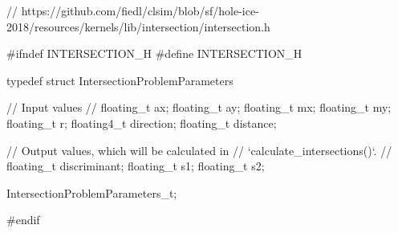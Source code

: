 \begin{ccode}
// https://github.com/fiedl/clsim/blob/sf/hole-ice-2018/resources/kernels/lib/intersection/intersection.h

#ifndef INTERSECTION_H
#define INTERSECTION_H

typedef struct IntersectionProblemParameters {

  // Input values
  //
  floating_t ax;
  floating_t ay;
  floating_t mx;
  floating_t my;
  floating_t r;
  floating4_t direction;
  floating_t distance;

  // Output values, which will be calculated in
  // `calculate_intersections()`.
  //
  floating_t discriminant;
  floating_t s1;
  floating_t s2;

} IntersectionProblemParameters_t;

#endif
\end{ccode}